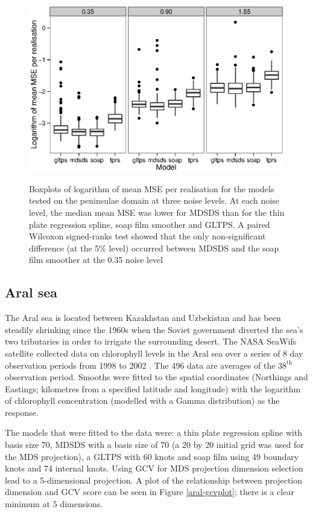 \documentclass[smallextended]{svjour3}       %
\begin{document}
\begin{figure}
\centering
\includegraphics[width=\textwidth]{Fig5.eps} \\
\caption{Boxplots of logarithm of mean MSE per realisation for the models tested on the peninsulae domain at three noise levels. At each noise level, the median mean MSE was lower for MDSDS than for the thin plate regression spline, soap film smoother and GLTPS. A paired Wilcoxon signed-ranks test showed that the only non-significant difference (at the 5\% level) occurred between MDSDS and the soap film smoother at the 0.35 noise level}
\label{wt2-boxplots}
\end{figure}


\subsection{Aral sea}

The Aral sea is located between Kazakhstan and Uzbekistan and has been steadily shrinking since the 1960s when the Soviet government diverted the sea's two tributaries in order to irrigate the surrounding desert. The NASA SeaWifs satellite collected data on chlorophyll levels in the Aral sea over a series of 8 day observation periods from 1998 to 2002 \citep{Wood:2008vo}. The 496 data are averages of the $38^\text{th}$ observation period. Smooths were fitted to the spatial coordinates (Northings and Eastings; kilometres from a specified latitude and longitude) with the logarithm of chlorophyll concentration (modelled with a Gamma distribution) as the response.

The models that were fitted to the data were: a thin plate regression spline with basis size 70, MDSDS with a basis size of 70 (a 20 by 20 initial grid was used for the MDS projection), a GLTPS with 60 knots and soap film using 49 boundary knots and 74 internal knots. Using GCV for MDS projection dimension selection lead to a 5-dimensional projection. A plot of the relationship between projection dimension and GCV score can be seen in Figure \ref{aral-gcvplot}; there is a clear minimum at 5 dimensions.
\end{document}
